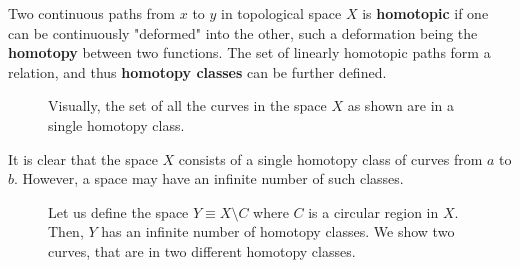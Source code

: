     \begin{definition}[Homotopy]
      Two continuous paths from $x$ to $y$ in topological space $X$ is \textbf{homotopic} if one can be continuously "deformed" into the other, such a deformation being the \textbf{homotopy} between two functions. The set of linearly homotopic paths form a relation, and thus \textbf{homotopy classes} can be further defined. 
      \begin{figure}[H]
        \centering 
        \caption{Visually, the set of all the curves in the space $X$ as shown are in a single homotopy class.} 
        \label{fig:homotopy_class}
      \end{figure}
    \end{definition}

    It is clear that the space $X$ consists of a single homotopy class of curves from $a$ to $b$. However, a space may have an infinite number of such classes. 

    \begin{figure}[H]
      \centering 
      \caption{Let us define the space $Y \equiv X \setminus C$ where $C$ is a circular region in $X$. Then, $Y$ has an infinite number of homotopy classes. We show two curves, that are in two different homotopy classes. }
      \label{fig:homotopy_class}
    \end{figure}

